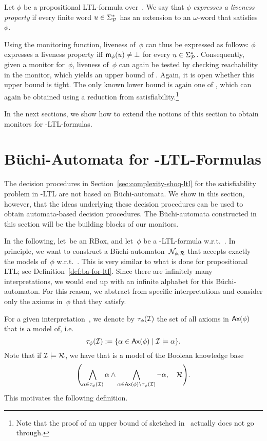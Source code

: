 \begin{definition}[Liveness]\label{def:liveness-ltl}
    Let $\phi$ be a propositional LTL-formula over~\Pmc.  We say that $\phi$
    \emph{expresses a liveness property} if every finite word
    $u\in\Sigma_\mathcal{P}^*$ has an extension to an $\omega$-word that
    satisfies~$\phi$.
\end{definition}

\noindent
Using the monitoring function, liveness of~$\phi$ can thus be expressed as
follows: $\phi$ expresses a liveness property iff $\mathsf{m}_\phi(u)\ne\bot$ for
every $u\in\Sigma_\mathcal{P}^*$.  Consequently, given a monitor for~$\phi$, liveness
of~$\phi$ can again be tested by checking reachability in the monitor, which
yields an upper bound of \ExpSpace.  Again, it is open whether
this upper bound is tight.  The only known lower bound is again one of \PSpace,
which can again be obtained using a reduction from satisfiability.\footnote{%
    Note that the proof of an upper bound of \PSpace sketched
    in~\cite{UlWo-CoRR01} actually does not go through.}

In the next sections, we show how to extend the notions of this section to
obtain monitors for \SHOQ-LTL-formulas.


\section{Büchi-Automata for \texorpdfstring{\SHOQ-LTL}{SHOQ-LTL}-Formulas}\label{sec:ba-for-shoq-ltl}

The decision procedures in Section~\ref{sec:complexity-shoq-ltl} for the
satisfiability problem in \SHOQ-LTL are not based on Büchi-automata.  We show in
this section, however, that the ideas underlying these decision procedures can
be used to obtain automata-based decision procedures.  The Büchi-automata
constructed in this section will be the building blocks of our monitors.

In the following, let~\Rmc be an RBox, and let~$\phi$ be a \SHOQ-LTL-formula
w.r.t.~\Rmc.  In principle, we want to construct a
Büchi-automaton~$\mathcal{N}_{\phi,\mathcal{R}}$ that accepts exactly the models of~$\phi$
w.r.t.~\Rmc.  This is very similar to what is done for propositional LTL\@; see
Definition~\ref{def:ba-for-ltl}.  Since there are infinitely many
interpretations, we would end up with an infinite alphabet for this
Büchi-automaton.  For this reason, we abstract from specific interpretations and
consider only the axioms in~$\phi$ that they satisfy.

For a given interpretation~\Imc, we denote by $\tau_\phi(\mathcal{I})$ the set of all
axioms in $\operatorname{\mathsf{Ax}}(\phi)$ that \Imc is a model of, i.e.\
\[\tau_\phi(\mathcal{I}):=\{\alpha\in\operatorname{\mathsf{Ax}}(\phi)\mid\mathcal{I}\models\alpha\}.\]
%
Note that if $\mathcal{I}\models\mathcal{R}$, we have that \Imc is a model of the Boolean
knowledge base
\[\Biggl(\bigwedge_{\alpha\in\tau_\phi(\Imc)}\alpha\land%
    \bigwedge_{\alpha\in\Ax(\phi)\setminus\tau_\phi(\Imc)}\lnot\alpha,\quad\Rmc\Biggr).\]
%
This motivates the following definition.

